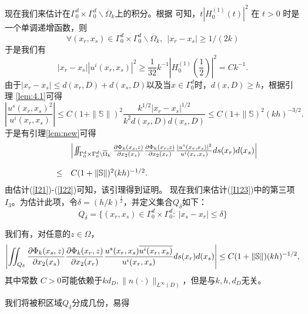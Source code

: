 现在我们来估计在$\Gamma_0^d\times\Gamma_0^d\backslash\overline\Omega_k$上的积分。根据 \cite[p. 446]{watson} 可知，$t|H_{0}^{(1)}(t)|^2$ 在 $t >0$ 时是一个单调递增函数，则
\begin{equation*}
\forall (x_r,x_s)\in \Gamma_0^d\times\Gamma_0^d\backslash\overline\Omega_k,\ \ |x_r-x_s|\geq 1/(2k)
\end{equation*}
于是我们有
\begin{equation*}
|x_r-x_s||u^i(x_r,x_s)|^2\geq\frac{1}{32} k^{-1}\left|H_{0}^{(1)}\left(\frac 12\right)\right|^2=Ck^{-1}.
\end{equation*}
由于$|x_r-x_s|\leq d(x_r,D)+d(x_s,D)$以及当$ x\in\Gamma_0^d$时，$d(x,D)\geq h$，根据引理 \ref{lem:4.1}可得
\begin{equation*}
\left|\frac{u^s(x_r,x_s)^2}{u^i(x_r,x_s)}\right|\leq C(1+\|\mathbb{S}\|)^2\frac{k^{1/2}|x_r-x_s|^{1/2}}{k^2d(x_r,D)d(x_s,D)}\leq C(1+\|\mathbb{S})^2(kh)^{-3/2}.
\end{equation*}
于是有引理\ref{lem:new}可得
\begin{eqnarray*}\label{I22}
\begin{array}{lll}
& &\left|\int\hskip-6pt\int_{ \Gamma_0^d\times\Gamma_0^d\backslash\overline\Omega_k} \frac{\partial\Phi_k(x_s,z)}{\partial x_2(x_s)}\frac{\partial\Phi_k(x_r,z)}{\partial x_2(x_r)}
  \frac{|u^s(x_r,x_s)|^2}{u^i(x_r,x_s)}ds(x_r)d(x_s)\right|\\
& &\\
&\leq&C(1 + \|\mathbb{S}\|)^2(kh)^{-1/2}.
\end{array}
\end{eqnarray*}
由估计(\ref{I21})-(\ref{I22})可知，该引理得到证明。
\finproof
现在我们来估计(\ref{I123})中的第三项$I_3$。为估计此项，令$\delta=(h/k)^{\frac12}$，并定义集合$Q_\delta$如下：
\begin{equation}\label{Qdelta}
Q_\delta=\{(x_r,x_s)\in \Gamma_0^d\times\Gamma_0^d:\ |x_s-x_r|\leq \delta\}
\end{equation}
\begin{lemma}\label{lem:4.4}
我们有，对任意的$z\in\Omega$，
$$
\left|\int\hskip-6pt\int_{Q_{\delta}}\frac{\partial\Phi_k(x_s,z)}{\partial x_2(x_s)}\frac{\partial\Phi_k(x_r,z)}{\partial x_2(x_r)}
  \frac{u^s(x_r,x_s)
  \overline{u^i(x_r,x_s)}}{u^i(x_r,x_s)}ds(x_r)d(x_s)\right|\leq C(1 + \|\mathbb{S}\|)(kh)^{-1/2},
$$
其中常数 $C>0$可能依赖于$kd_D,\|n(\cdot)\|_{L^{\infty}(D)}$，但是与$k, h, d_D$无关。
\end{lemma}
\debproof
我们将被积区域$Q_{\delta}$分成几份，易得
